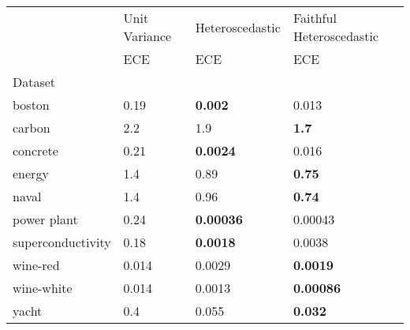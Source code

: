 \begin{tabular}{l|l|l|l}
\toprule
 & Unit Variance & Heteroscedastic & Faithful Heteroscedastic \\
 & ECE & ECE & ECE \\
Dataset &  &  &  \\
\midrule
boston & 0.19 & \bfseries 0.002 & 0.013 \\
carbon & 2.2 & 1.9 & \bfseries 1.7 \\
concrete & 0.21 & \bfseries 0.0024 & 0.016 \\
energy & 1.4 & 0.89 & \bfseries 0.75 \\
naval & 1.4 & 0.96 & \bfseries 0.74 \\
power plant & 0.24 & \bfseries 0.00036 & 0.00043 \\
superconductivity & 0.18 & \bfseries 0.0018 & 0.0038 \\
wine-red & 0.014 & 0.0029 & \bfseries 0.0019 \\
wine-white & 0.014 & 0.0013 & \bfseries 0.00086 \\
yacht & 0.4 & 0.055 & \bfseries 0.032 \\
\bottomrule
\end{tabular}
